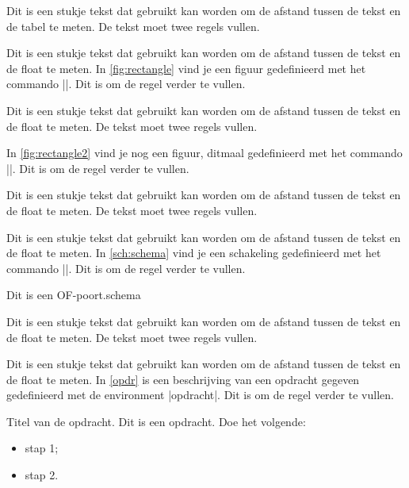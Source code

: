 \begin{llstShortInline}
Dit is een stukje tekst dat gebruikt kan worden om de afstand tussen de tekst en de tabel te meten. 
De tekst moet twee regels vullen. 

\clearpage
Dit is een stukje tekst dat gebruikt kan worden om de afstand tussen de tekst en de float te meten. 
In \cref{fig:rectangle} vind je een figuur gedefinieerd met het commando |\tikzfiguur|. 
Dit is om de regel verder te vullen.


Dit is een stukje tekst dat gebruikt kan worden om de afstand tussen de tekst en de float te meten. 
De tekst moet twee regels vullen. 

In \cref{fig:rectangle2} vind je nog een figuur, ditmaal gedefinieerd met het commando |\tikzinlinefiguur|. 
Dit is om de regel verder te vullen.


Dit is een stukje tekst dat gebruikt kan worden om de afstand tussen de tekst en de float te meten. 
De tekst moet twee regels vullen. 

\clearpage
Dit is een stukje tekst dat gebruikt kan worden om de afstand tussen de tekst en de float te meten. 
In \cref{sch:schema} vind je een schakeling gedefinieerd met het commando |\schakeling|. 
Dit is om de regel verder te vullen.

{Dit is een OF-poort.}{schema}

Dit is een stukje tekst dat gebruikt kan worden om de afstand tussen de tekst en de float te meten. 
De tekst moet twee regels vullen. 

\clearpage
Dit is een stukje tekst dat gebruikt kan worden om de afstand tussen de tekst en de float te meten. 
In \cref{opdr} is een beschrijving van een opdracht gegeven gedefinieerd met de environment |opdracht|. 
Dit is om de regel verder te vullen.

\begin{opdracht}{Titel van de opdracht.}
\label{opdr}
Dit is een opdracht. Doe het volgende:
\begin{itemize}
	\item stap 1;
	\item stap 2.
\end{itemize}
\end{opdracht}


\end{llstShortInline}
